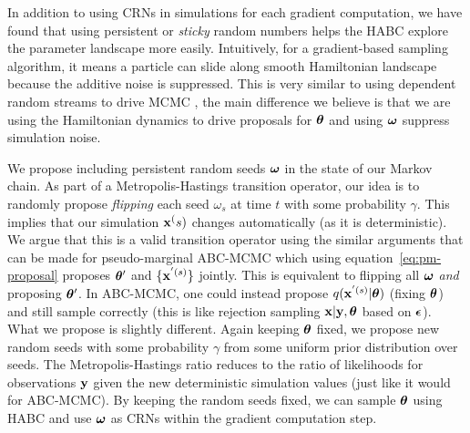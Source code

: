 \documentclass[]{article}
\begin{document}
In addition to using CRNs in simulations for each gradient computation, we have found that using persistent or {\em sticky} random numbers helps the HABC explore the parameter landscape more easily.  Intuitively, for a gradient-based sampling algorithm, it means a particle can slide along smooth Hamiltonian landscape because    the additive noise is suppressed.  This is very similar to using dependent random streams to drive MCMC \cite{Murray2012,Neal2012}, the main difference we believe is that we are using the Hamiltonian dynamics to drive proposals for ${\bm \theta}$ and using ${\bm \omega}$ suppress simulation noise.

  
We propose including persistent random seeds ${\bm \omega}$ in the state of our Markov chain.  As part of a Metropolis-Hastings transition operator, our idea is to randomly propose {\em flipping} each seed $\omega_s$ at time $t$ with some probability $\gamma$.  This implies that our simulation ${\bf x}^(s)$ changes automatically (as it is deterministic).  We argue that this is a valid transition operator using the similar arguments that can be made for pseudo-marginal ABC-MCMC which using equation~\ref{eq:pm-proposal} proposes ${\bm \theta^{\prime}}$ and $\{ {\bf x}^{'(s)}\}$ jointly.  
This is equivalent to flipping all ${\bm \omega}$ {\em and} proposing ${\bm \theta^{\prime}}$.  In ABC-MCMC, one could instead propose $q({\bf x}^{'(s)} | {\bm \theta})$ (fixing ${\bm \theta}$) and still sample correctly (this is like rejection sampling ${\bf x} | {\bf y}, {\bm \theta}$ based on ${\bm {\epsilon}}$).  What we propose is slightly different.  Again keeping ${\bm \theta}$ fixed, we propose new random seeds with some probability $\gamma$ from some uniform prior distribution over seeds.  The Metropolis-Hastings ratio reduces to the ratio of likelihoods for observations ${\bf y}$ given the new deterministic simulation values (just like it would for ABC-MCMC).  By keeping the random seeds fixed, we can sample ${\bm \theta}$ using HABC and use ${\bm \omega}$ as CRNs within the gradient computation step.
\end{document}
